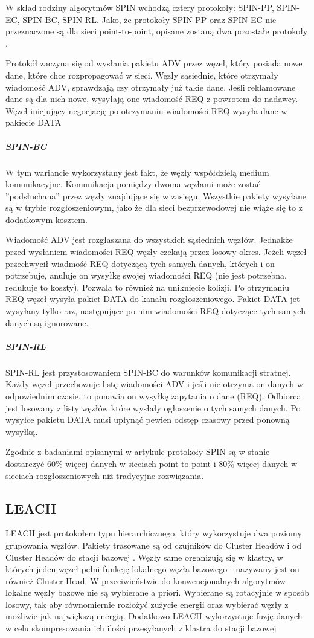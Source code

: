 W skład rodziny algorytmów SPIN wchodzą cztery protokoły: SPIN-PP, SPIN-EC, SPIN-BC, SPIN-RL. Jako, że protokoły SPIN-PP oraz SPIN-EC nie przeznaczone są dla sieci point-to-point, opisane zostaną dwa pozostałe protokoły \cite{Dargie2010, Kulik2002}.

Protokół zaczyna się od wysłania pakietu ADV przez węzeł, który posiada nowe dane, które chce rozpropagować w sieci. Węzły sąsiednie, które otrzymały wiadomość ADV, sprawdzają czy otrzymały już takie dane. Jeśli reklamowane dane są dla nich nowe, wysyłają one wiadomość REQ z powrotem do nadawcy. Węzeł inicjujący negocjację po otrzymaniu wiadomości REQ wysyła dane w pakiecie DATA

\subparagraph{SPIN-BC}
W tym wariancie wykorzystany jest fakt, że węzły współdzielą medium komunikacyjne. Komunikacja pomiędzy dwoma węzłami może zostać ''podsłuchana'' przez węzły znajdujące się w zasięgu. Wszystkie pakiety wysyłane są w trybie rozgłoszeniowym, jako że dla sieci bezprzewodowej nie wiąże się to z dodatkowym kosztem.

Wiadomość ADV jest rozgłaszana do wszystkich sąsiednich węzłów. Jednakże przed wysłaniem wiadomości REQ węzły czekają przez losowy okres. Jeżeli węzeł przechwycił wiadmość REQ dotyczącą tych samych danych, których i on potrzebuje, anuluje on wysyłkę swojej wiadomości REQ (nie jest potrzebna, redukuje to koszty). Pozwala to również na uniknięcie kolizji. Po otrzymaniu REQ węzeł wysyła pakiet DATA do kanału rozgłoszeniowego. Pakiet DATA jet wysyłany tylko raz, następujące po nim wiadomości REQ dotyczące tych samych danych są ignorowane.
\subparagraph{SPIN-RL}
SPIN-RL jest przystosowaniem SPIN-BC do warunków komunikacji stratnej. Każdy węzeł przechowuje listę wiadomości ADV i jeśli nie otrzyma on danych w odpowiednim czasie, to ponawia on wysyłkę zapytania o dane (REQ). Odbiorca jest losowany z listy węzłów które wysłały ogłoszenie o tych samych danych.
Po wysyłce pakietu DATA musi upłynąć pewien odstęp czasowy przed ponowną wysyłką.

Zgodnie z badaniami opisanymi w artykule \cite{Kulik2002} protokoły SPIN są w stanie dostarczyć 60\% więcej danych w sieciach point-to-point i 80\% więcej danych w sieciach rozgłoszeniowych niż tradycyjne rozwiązania.  
\subsection{LEACH}
LEACH jest protokołem typu hierarchicznego, który wykorzystuje dwa poziomy grupowania węzłów. Pakiety trasowane są od czujników do Cluster Headów i od Cluster Headów do stacji bazowej \cite{Yu2006}.
Węzły same organizują się w klastry, w których jeden węzeł pełni funkcję lokalnego węzła bazowego - nazywany jest on również Cluster Head. W przeciwieństwie do konwencjonalnych algorytmów lokalne węzły bazowe nie są wybierane a priori. Wybierane są rotacyjnie w sposób losowy, tak aby równomiernie rozłożyć zużycie energii oraz wybierać węzły z możliwie jak największą energią. Dodatkowo LEACH wykorzystuje fuzję danych w celu skompresowania ich ilości przesyłanych z klastra do stacji bazowej \cite{Akkaya2005}%

